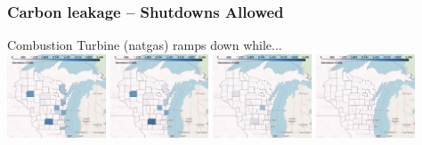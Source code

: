 \documentclass[xcolor=dvipsnames]{beamer}
\begin{document}
\begin{frame}
  \frametitle{Carbon leakage -- Shutdowns Allowed}
  Combustion Turbine (natgas) ramps down while... \\
  \includegraphics[width=0.22\textwidth]{includes/no_leakage_shutdowns_CT_r0.png}
  \includegraphics[width=0.22\textwidth]{includes/no_leakage_shutdowns_CT_r2.png}
  \includegraphics[width=0.22\textwidth]{includes/no_leakage_shutdowns_CT_r3.png}
  \includegraphics[width=0.22\textwidth]{includes/no_leakage_shutdowns_CT_r4.png}


\end{frame}
\end{document}
